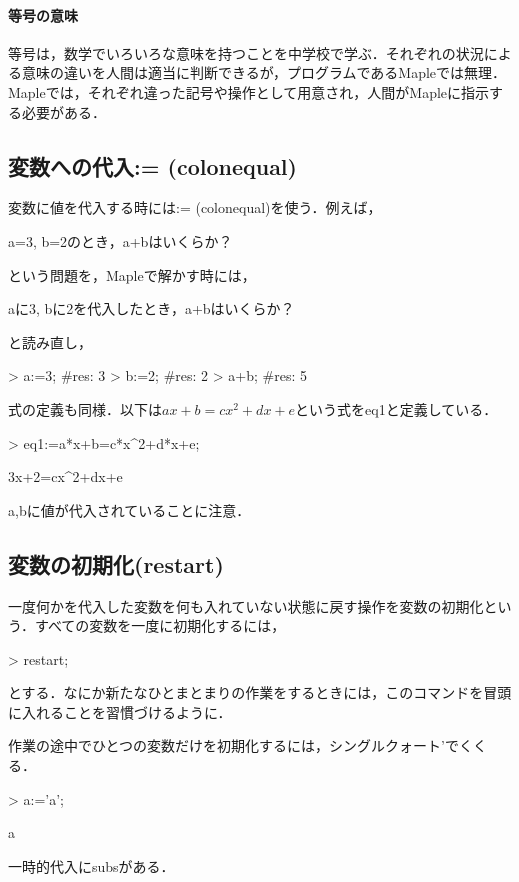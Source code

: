 \paragraph{等号の意味}
等号は，数学でいろいろな意味を持つことを中学校で学ぶ．それぞれの状況による意味の違いを人間は適当に判断できるが，プログラムであるMapleでは無理．Mapleでは，それぞれ違った記号や操作として用意され，人間がMapleに指示する必要がある．

\subsection{変数への代入:= (colonequal)}
変数に値を代入する時には:= (colonequal)を使う．例えば，
\begin{MapleError}
a=3, b=2のとき，a+bはいくらか？
\end{MapleError}
という問題を，Mapleで解かす時には，
\begin{MapleError}
aに3, bに2を代入したとき，a+bはいくらか？
\end{MapleError}
と読み直し，
\begin{MapleInput}
> a:=3; #res: 3
> b:=2; #res: 2
> a+b;  #res: 5
\end{MapleInput}
式の定義も同様．以下は$ax+b=cx^2+dx+e$という式をeq1と定義している．
\begin{MapleInput}
> eq1:=a*x+b=c*x^2+d*x+e;
\end{MapleInput}
\begin{MapleOutput}
3x+2=cx^2+dx+e
\end{MapleOutput}
a,bに値が代入されていることに注意．

\subsection{変数の初期化(restart)}
一度何かを代入した変数を何も入れていない状態に戻す操作を変数の初期化という．すべての変数を一度に初期化するには，
\begin{MapleInput}
> restart;
\end{MapleInput}
とする．なにか新たなひとまとまりの作業をするときには，このコマンドを冒頭に入れることを習慣づけるように．

作業の途中でひとつの変数だけを初期化するには，シングルクォート’でくくる．
\begin{MapleInput}
> a:='a';
\end{MapleInput}
\begin{MapleOutput}
a
\end{MapleOutput}
一時的代入にsubsがある．